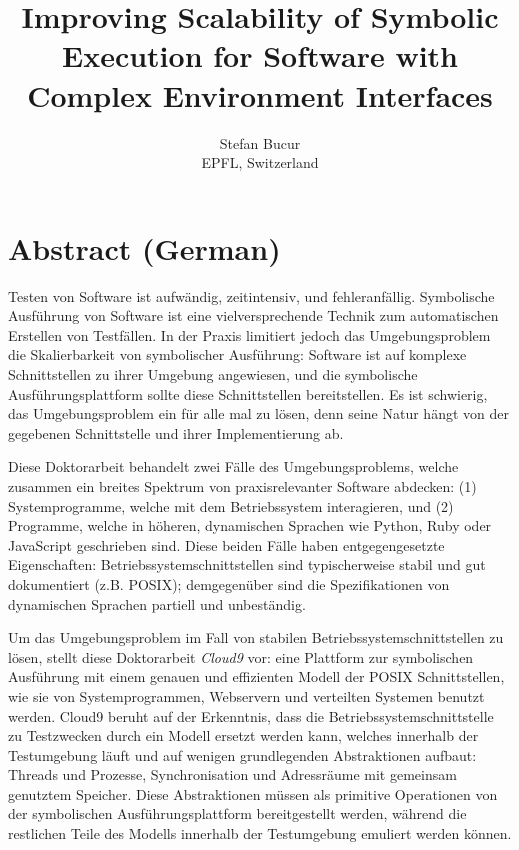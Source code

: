 \documentclass[letterpaper,10pt,oneside]{book}
\newcommand{\thesistitle}{Improving Scalability of Symbolic Execution for Software with Complex Environment Interfaces}
\newcommand{\cnine}{Cloud9\xspace}
\begin{document}
\title{\thesistitle}
\author{Stefan Bucur \\ EPFL, Switzerland}

\maketitle

\chapter*{Abstract (German)}

Testen von Software ist aufwändig, zeitintensiv, und fehleranfällig. Symbolische Ausführung von Software ist eine vielversprechende Technik zum automatischen Erstellen von Testfällen. In der Praxis limitiert jedoch das Umgebungsproblem die Skalierbarkeit von symbolischer Ausführung: Software ist auf komplexe Schnittstellen zu ihrer Umgebung angewiesen, und die symbolische Ausführungsplattform sollte diese Schnittstellen bereitstellen. Es ist schwierig, das Umgebungsproblem ein für alle mal zu lösen, denn seine Natur hängt von der gegebenen Schnittstelle und ihrer Implementierung ab.

Diese Doktorarbeit behandelt zwei Fälle des Umgebungsproblems, welche zusammen ein breites Spektrum von praxisrelevanter Software abdecken: (1) Systemprogramme, welche mit dem Betriebssystem interagieren, und (2) Programme, welche in höheren, dynamischen Sprachen wie Python, Ruby oder JavaScript geschrieben sind. Diese beiden Fälle haben entgegengesetzte Eigenschaften: Betriebssystemschnittstellen sind typischerweise stabil und gut dokumentiert (z.B. POSIX); demgegenüber sind die Spezifikationen von dynamischen Sprachen partiell und unbeständig.

Um das Umgebungsproblem im Fall von stabilen Betriebssystemschnittstellen zu lösen, stellt diese Doktorarbeit \emph{\cnine} vor: eine Plattform zur symbolischen Ausführung mit einem genauen und effizienten Modell der POSIX Schnittstellen, wie sie von Systemprogrammen, Webservern und verteilten Systemen benutzt werden. \cnine beruht auf der Erkenntnis, dass die Betriebssystemschnittstelle zu Testzwecken durch ein Modell ersetzt werden kann, welches innerhalb der Testumgebung läuft und auf wenigen grundlegenden Abstraktionen aufbaut: Threads und Prozesse, Synchronisation und Adressräume mit gemeinsam genutztem Speicher. Diese Abstraktionen müssen als primitive Operationen von der symbolischen Ausführungsplattform bereitgestellt werden, während die restlichen Teile des Modells innerhalb der Testumgebung emuliert werden können.
\end{document}
